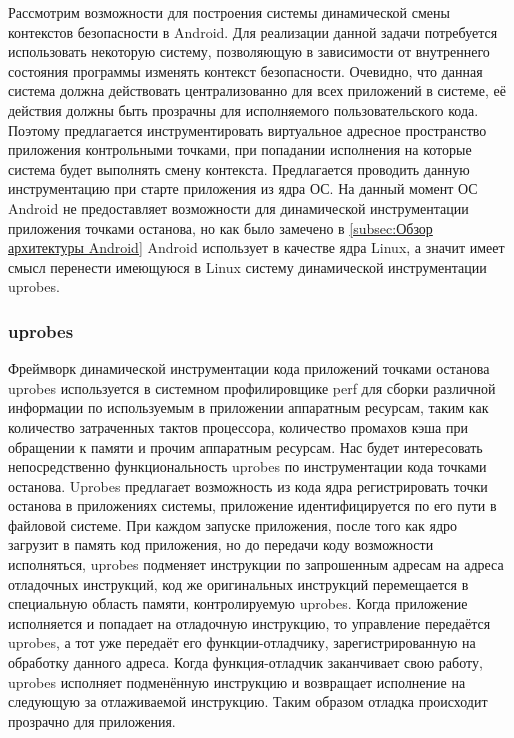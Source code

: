Рассмотрим возможности для построения системы динамической смены
контекстов безопасности в Android. Для реализации данной задачи
потребуется использовать некоторую систему, позволяющую в зависимости от
внутреннего состояния программы изменять контекст безопасности.
Очевидно, что данная система должна действовать централизованно для всех
приложений в системе, её действия должны быть прозрачны для исполняемого
пользовательского кода. Поэтому предлагается инструментировать
виртуальное адресное пространство приложения контрольными точками, при
попадании исполнения на которые система будет выполнять смену контекста.
Предлагается проводить данную инструментацию при старте приложения из
ядра ОС. На данный момент ОС Android не предоставляет возможности для
динамической инструментации приложения точками останова, но как было
замечено в \ref{subsec:Обзор архитектуры Android} Android использует в
качестве ядра Linux, а значит имеет смысл перенести имеющуюся в Linux
систему динамической инструментации uprobes. 

\subsubsection{uprobes}

Фреймворк динамической инструментации кода приложений точками останова
uprobes используется в системном профилировщике perf для сборки
различной информации по используемым в приложении аппаратным ресурсам,
таким как количество затраченных тактов процессора, количество промахов
кэша при обращении к памяти и прочим аппаратным ресурсам. Нас будет
интересовать непосредственно функциональность uprobes по инструментации
кода точками останова. Uprobes предлагает возможность из кода ядра
регистрировать точки останова в приложениях системы, приложение
идентифицируется по его пути в файловой системе. При каждом запуске
приложения, после того как ядро загрузит в память код приложения, но до
передачи коду возможности исполняться, uprobes подменяет инструкции по
запрошенным адресам на адреса отладочных инструкций, код же оригинальных
инструкций перемещается в специальную область памяти, контролируемую
uprobes. Когда приложение исполняется и попадает на отладочную
инструкцию, то управление передаётся uprobes, а тот уже передаёт его
функции-отладчику, зарегистрированную на обработку данного адреса. Когда
функция-отладчик заканчивает свою работу, uprobes исполняет подменённую
инструкцию и возвращает исполнение на следующую за отлаживаемой
инструкцию. Таким образом отладка происходит прозрачно для приложения.

